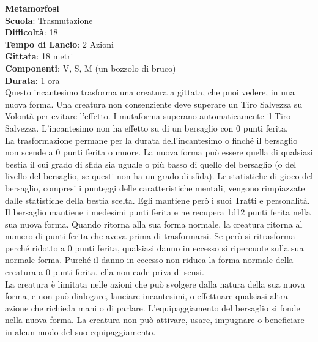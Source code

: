 \begin{multicols}{2}
\medskip\textbf{Metamorfosi}\\
\textbf{Scuola}: Trasmutazione\\
\textbf{Difficoltà}: 18\\
\textbf{Tempo di Lancio}: 2 Azioni\\
\textbf{Gittata}: 18 metri\\
\textbf{Componenti}: V, S, M (un bozzolo di bruco)\\
\textbf{Durata}: 1 ora \\
Questo incantesimo trasforma una creatura a gittata, che puoi vedere, in una nuova forma. Una creatura non consenziente deve superare un Tiro Salvezza su Volontà per evitare l'effetto. I mutaforma superano automaticamente il Tiro Salvezza. L'incantesimo non ha effetto su di un bersaglio con 0 punti ferita. \\
La trasformazione permane per la durata dell'incantesimo o finché il bersaglio non scende a 0 punti ferita o muore. La nuova forma può essere quella di qualsiasi bestia il cui grado di sfida sia uguale o più basso di quello del bersaglio (o del livello del bersaglio, se questi non ha un grado di sfida). Le statistiche di gioco del bersaglio, compresi i punteggi delle caratteristiche mentali, vengono rimpiazzate dalle statistiche della bestia scelta. Egli mantiene però i suoi Tratti e personalità.\\
Il bersaglio mantiene i medesimi punti ferita e ne recupera 1d12 punti ferita nella sua nuova forma. Quando ritorna alla sua forma normale, la creatura ritorna al numero di punti ferita che aveva prima di trasformarsi. Se però si ritrasforma perché ridotto a 0 punti ferita, qualsiasi danno in eccesso si ripercuote sulla sua normale forma. Purché il danno in eccesso non riduca la forma normale della creatura a 0 punti ferita, ella non cade priva di sensi.\\
La creatura è limitata nelle azioni che può svolgere dalla natura della sua nuova forma, e non può dialogare, lanciare incantesimi, o effettuare qualsiasi altra azione che richieda mani o di parlare. L'equipaggiamento del bersaglio si fonde nella nuova forma. La creatura non può attivare, usare, impugnare o beneficiare in alcun modo del suo equipaggiamento. 


\end{multicols}
